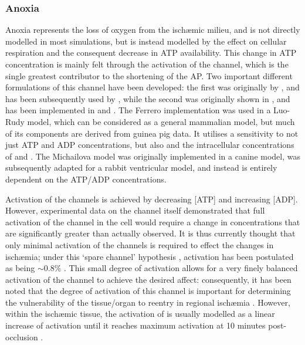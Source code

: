 \documentclass[../thesis-main.tex]{subfiles}
\begin{document}
 \subsubsection{Anoxia}
 \label{subsubsec:Anoxia}
 Anoxia represents the loss of oxygen from the isch\ae mic milieu, and is not directly modelled in most simulations, but is instead modelled by the effect on cellular respiration and the consequent decrease in ATP availability. This change in ATP concentration is mainly felt through the activation of the \ikatp{} channel, which is the single greatest contributor to the shortening of the AP. Two important different formulations of this channel have been developed: the first was originally by \citet{Ferrero1996}, and has been subsequently used by \citet{Trenor2007}, while the second was originally shown in \citet{Michailova2005}, and has been implemented in \citet{Terkildsen2007} and \citet{Michailova2007}. The Ferrero implementation was used in a Luo-Rudy model, which can be considered as a general mammalian model, but much of its components are derived from guinea pig data. It utilises a sensitivity to not just ATP and ADP concentrations, but also \ko{} and the intracellular concentrations of \na{} and \mg{}. The Michailova model was originally implemented in a canine model, was subsequently adapted for a rabbit ventricular model, and instead is entirely dependent on the ATP/ADP concentrations.
 
 Activation of the \ikatp{} channels is achieved by decreasing [ATP] and increasing [ADP]. However, experimental data on the channel itself demonstrated that full activation of the channel in the cell would require a change in concentrations that are significantly greater than actually observed. It is thus currently thought that only minimal activation of the \ikatp{} channels is required to effect the changes in isch\ae mia; under this `spare channel' hypothesis \citep{Cook1988}, activation has been postulated as being $\sim0.8\%$ \citep{Rodriguez2002, Weiss1992, Ferrero1996, Trenor2007}. This small degree of activation allows for a very finely balanced activation of the channel to achieve the desired affect: consequently, it has been noted that the degree of activation of this channel is important for determining the vulnerability of the tissue/organ to reentry in regional isch\ae mia \citep{Ferrero2003a, Trenor2005}. However, within the isch\ae mic tissue, the activation of \ikatp{} is usually modelled as a linear increase of activation until it reaches maximum activation at 10 minutes post-occlusion \citep{Trenor2007, Tice2007}.
 
\end{document}
